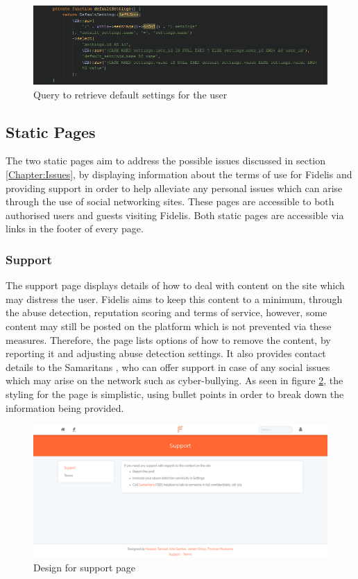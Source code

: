 \begin{figure}[H]
\centering
\includegraphics[width=\textwidth]{Images/Implementation/UserDefaultSettings}
\caption{Query to retrieve default settings for the user}
\label{fig:UserDefaultSettings}
\end{figure}

\subsection{Static Pages}
The two static pages aim to address the possible issues discussed in section \ref{Chapter:Issues}, by displaying information about the terms of use for Fidelis and providing support in order to help alleviate any personal issues which can arise through the use of social networking sites. These pages are accessible to both authorised users and guests visiting Fidelis. Both static pages are accessible via links in the footer of every page.

\subsubsection{Support}
The support page displays details of how to deal with content on the site which may distress the user. Fidelis aims to keep this content to a minimum, through the abuse detection, reputation scoring and terms of service, however, some content may still be posted on the platform which is not prevented via these measures. Therefore, the page lists options of how to remove the content, by reporting it and adjusting abuse detection settings. It also provides contact details to the Samaritans \cite{Samaritans:Home}, who can offer support in case of any social issues which may arise on the network such as cyber-bullying. As seen in figure \ref{fig:SupportPage}, the styling for the page is simplistic, using bullet points in order to break down the information being provided.

\begin{figure}[H]
\centering
\includegraphics[height=2in]{Images/Design/support-page}
\caption{Design for support page}
\label{fig:SupportPage}
\end{figure}

